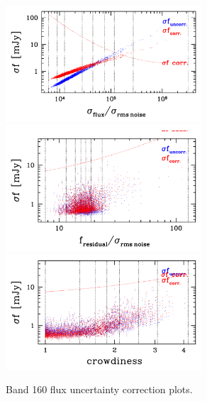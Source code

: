 \documentclass[11pt,a4paper]{article}
\begin{document}
\begin{figure}[H]
	\caption{
		Band 160 flux uncertainty correction plots.
	}
	\includegraphics[width=0.65\textwidth]{galsim_160_dfcorr_1}
	\includegraphics[width=0.65\textwidth]{galsim_160_dfcorr_2}
	\includegraphics[width=0.65\textwidth]{galsim_160_dfcorr_3}
\end{figure}
\end{document}
